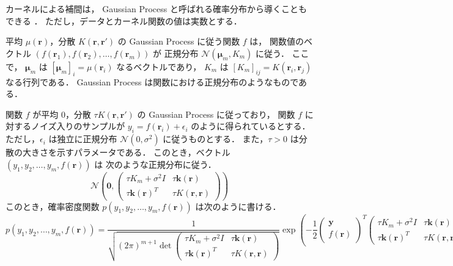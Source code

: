 カーネルによる補間は，
Gaussian Process と呼ばれる確率分布から導くこともできる
\cite{Brochu2010}．
ただし，データとカーネル関数の値は実数とする．

平均 $\mu(\bm{r})$，分散 $K(\bm{r}, \bm{r}')$ の Gaussian Process に従う関数 $f$ は，
関数値のベクトル $(f(\bm{r}_1), f(\bm{r}_2), \ldots, f(\bm{r}_m))$ が
正規分布 $\mathcal{N}(\bm{\mu}_m, K_m)$ に従う．
ここで，
$\bm{\mu}_m$ は $[\bm{\mu}_m]_i = \mu(\bm{r}_i)$ なるベクトルであり，
$K_m$ は $[K_m]_{ij} = K(\bm{r}_i, \bm{r}_j)$ なる行列である．
Gaussian Process は関数における正規分布のようなものである．

関数 $f$ が平均 $0$，分散 $\tau K(\bm{r}, \bm{r}')$ の Gaussian Process に従っており，
関数 $f$ に対するノイズ入りのサンプルが $y_i = f(\bm{r}_i) + \epsilon_i$ のように得られているとする．
ただし，$\epsilon_i$ は独立に正規分布 $\mathcal{N}(0, \sigma^2)$ に従うものとする．
また，$\tau > 0$ は分散の大きさを示すパラメータである．
このとき，ベクトル $(y_1, y_2, \ldots, y_m, f(\bm{r}))$ は
次のような正規分布に従う．
\begin{equation}
    \mathcal{N}\left(\bm{0},
    \begin{pmatrix}
        \tau K_m + \sigma^2 I & \tau \bm{k}(\bm{r})    \\
        \tau \bm{k}(\bm{r})^T & \tau K(\bm{r}, \bm{r})
    \end{pmatrix}
    \right)
\end{equation}
このとき，確率密度関数 $p(y_1, y_2, \ldots, y_m, f(\bm{r}))$ は次のように書ける．
\begin{equation}
    p(y_1, y_2, \ldots, y_m, f(\bm{r}))
    = \frac{1}{\sqrt{(2\pi)^{m+1} \det{
                \begin{pmatrix}
                    \tau K_m + \sigma^2 I & \tau \bm{k}(\bm{r})    \\
                    \tau \bm{k}(\bm{r})^T & \tau K(\bm{r}, \bm{r})
                \end{pmatrix}
            }}}
    \exp\left(-\frac{1}{2}
    \begin{pmatrix}
        \bm{y} \\ f(\bm{r})
    \end{pmatrix}^T
    \begin{pmatrix}
        \tau K_m + \sigma^2 I & \tau \bm{k}(\bm{r})    \\
        \tau \bm{k}(\bm{r})^T & \tau K(\bm{r}, \bm{r})
    \end{pmatrix}^{-1}
    \begin{pmatrix}
        \bm{y} \\ f(\bm{r})
    \end{pmatrix}
    \right)
\end{equation}

